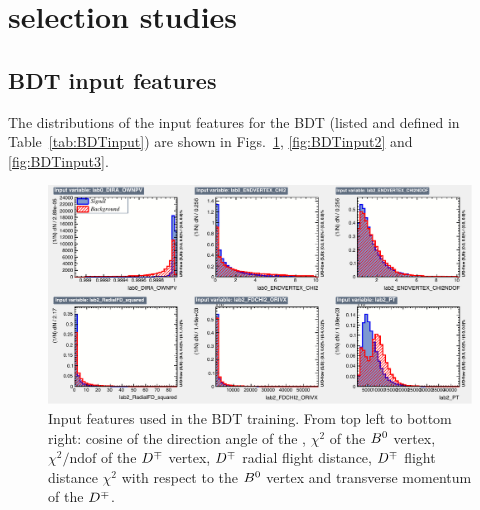 \section[$\Bz\to\Dmp\pim$ selection studies]{\boldmath{$\Bz\to\Dmp\pim$} selection studies}
\label{app:selectionStudies}

\subsection{BDT input features}
\label{app:BDTinput}
The distributions of the input features for the BDT (listed and defined in Table~\ref{tab:BDTinput})
are shown in Figs.~\ref{fig:BDTinput1}, \ref{fig:BDTinput2} and \ref{fig:BDTinput3}.

\begin{figure}[htpb]
  \begin{center}
    \includegraphics[width=\textwidth]{AA-Appdx-selection/figs/variables_id_c1.pdf}
  \end{center}
  \vspace{-2mm}
  \caption{Input features used in the BDT training. From top left to bottom right: cosine of the direction angle of
  		the \Bz, $\chi^2$ of the $B^0$ vertex, $\chi^2/\text{ndof}$ of the $D^\mp$ vertex, $D^\mp$ radial flight
  		distance, $D^\mp$ flight distance $\chi^2$ with respect to the $B^0$ vertex and transverse momentum of the $D^\mp$.}
  \label{fig:BDTinput1}
\end{figure}
